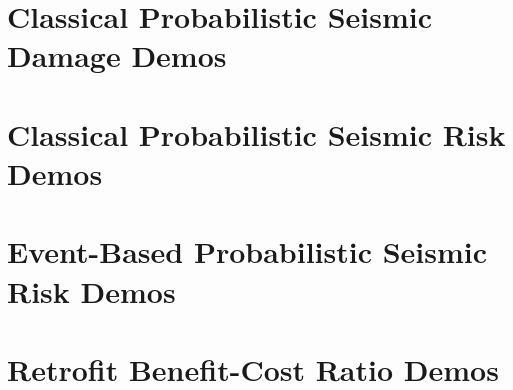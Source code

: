 \section{Classical Probabilistic Seismic Damage Demos}
\label{sec:demos_classical_damage}


\section{Classical Probabilistic Seismic Risk Demos}
\label{sec:demos_classical_risk}


\section{Event-Based Probabilistic Seismic Risk Demos}
\label{sec:demos_event_based_risk}


\section{Retrofit Benefit-Cost Ratio Demos}
\label{sec:demos_benefit_cost}
